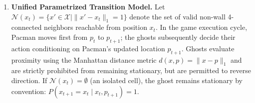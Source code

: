 \documentclass{article}
\begin{document}
\begin{enumerate}[label=\alph*.,leftmargin=*]
    For a given candidate ghost location $x_t \in \mathcal{X}$, observing evidence $e_t$ requires the realization $K_t = e_t - d(x_t, p_t) + np$. Thus, the sensor likelihood model $P(e_t \mid x_t, p_t)$ is given by the Binomial Probability Mass Function (PMF):
    \begin{equation}
        P(e_t \mid x_t, p_t) = \begin{cases}
            \displaystyle \binom{n}{k} p^k (1-p)^{n-k} & \text{if } x_t \in \mathcal{X} \text{ and } k = e_t - d(x_t, p_t) + np \in \{0, 1, \dots, n\} \\
            0 & \text{otherwise}
        \end{cases}
    \end{equation}
    In the special deterministic case where $\sigma^2 = 0$ ($n = 0$), the sensor is noiseless, yielding:
    \begin{equation}
        P(e_t \mid x_t, p_t) = \begin{cases}
            1 & \text{if } x_t \in \mathcal{X} \text{ and } e_t = d(x_t, p_t) \\
            0 & \text{otherwise}
        \end{cases}
    \end{equation}
    For any wall cell $x_t \in \mathcal{W}$, $P(e_t \mid x_t, p_t) = 0$ holds identically. Spatially, this likelihood forms concentric diamond rings (isodistance contours) centered at $p_t$, assigning maximum probability to cells whose true distance exactly matches the evidence.

    \item \textbf{Unified Parametrized Transition Model.}
    Let $\mathcal{N}(x_t) = \{x' \in \mathcal{X} \mid \|x' - x_t\|_1 = 1\}$ denote the set of valid non-wall 4-connected neighbors reachable from position $x_t$. In the game execution cycle, Pacman moves first from $p_t$ to $p_{t+1}$; the ghosts subsequently decide their action conditioning on Pacman's updated location $p_{t+1}$. Ghosts evaluate proximity using the Manhattan distance metric $d(x, p) = \|x - p\|_1$ and are strictly prohibited from remaining stationary, but are permitted to reverse direction. If $\mathcal{N}(x_t) = \emptyset$ (an isolated cell), the ghost remains stationary by convention: $P(x_{t+1}=x_t \mid x_t, p_{t+1}) = 1$.


\end{enumerate}
\end{document}
